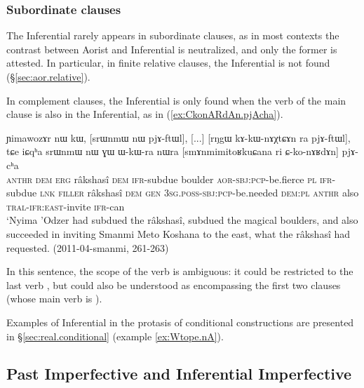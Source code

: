 \subsubsection{Subordinate clauses}  \label{sec:pst.ifr.subordinate}
The Inferential rarely appears in subordinate clauses, as in most contexts the contrast between Aorist and Inferential is neutralized, and only the former is attested. In particular, in finite relative clauses, the Inferential is not found (§\ref{sec:aor.relative}). 

In complement clauses, the Inferential is only found when the verb of the main clause is also in the Inferential, as in (\ref{ex:CkonARdAn.pjAcha}). 


\begin{exe}
\ex \label{ex:CkonARdAn.pjAcha}
 \gll  ɲimawozɤr nɯ kɯ, [srɯnmɯ nɯ pjɤ-ftɯl], [...] [rŋgɯ kɤ-kɯ-nɤχtɕɤn ra pjɤ-ftɯl],
tɕe iɕqʰa srɯnmɯ nɯ ɣɯ ɯ-kɯ-ra nɯra [smɤnmimitoʁkuɕana ri ɕ-ko-nɤʁdɤn] pjɤ-cʰa \\
\textsc{anthr} \textsc{dem} \textsc{erg} râkshasî \textsc{dem} \textsc{ifr}-subdue { } boulder \textsc{aor}-\textsc{sbj}:\textsc{pcp}-be.fierce \textsc{pl} \textsc{ifr}-subdue \textsc{lnk} \textsc{filler} râkshasî \textsc{dem} \textsc{gen} \textsc{3sg}.\textsc{poss}-\textsc{sbj}:\textsc{pcp}-be.needed \textsc{dem}:\textsc{pl}  \textsc{anthr} also \textsc{tral}-\textsc{ifr}:\textsc{east}-invite \textsc{ifr}-can \\
\glt `Nyima 'Odzer had subdued the râkshasî, subdued the magical boulders, and also succeeded in inviting Smanmi Meto Koshana to the east, what the râkshasî had requested. (2011-04-smanmi, 261-263)
\end{exe}

In this sentence, the scope of the verb  is ambiguous: it could be restricted to the last verb , but could also be understood as encompassing the first two clauses (whose main verb is ).

Examples of Inferential in the protasis of conditional constructions are presented in §\ref{sec:real.conditional} (example \ref{ex:Wtope.nA}).

\subsection{Past Imperfective and Inferential Imperfective} \label{sec:pst.ifr.ipfv}

